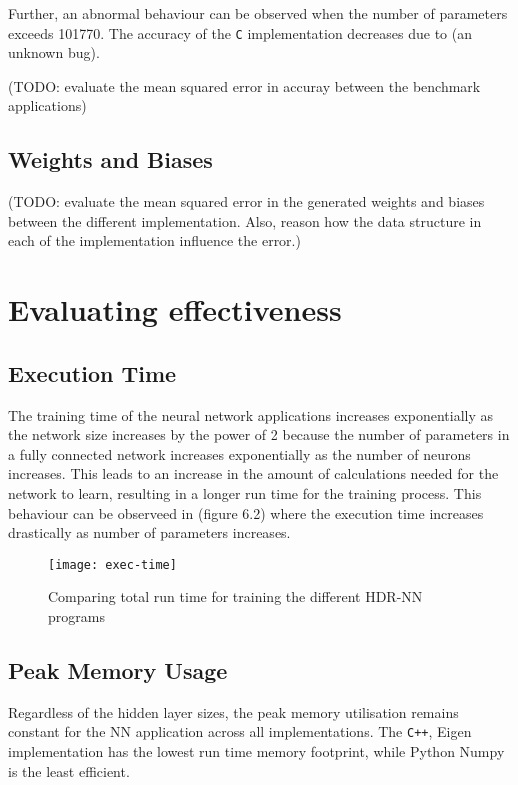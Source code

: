 Further, an abnormal behaviour can be observed when the number of parameters exceeds 101770. The accuracy of the \verb!C! implementation decreases due to (an unknown bug).

(TODO: evaluate the mean squared error in accuray between the benchmark applications)

\subsection{Weights and Biases}
(TODO: evaluate the mean squared error in the generated weights and biases between the different implementation. Also, reason how the data structure in each of the implementation influence the error.)


\section{Evaluating effectiveness}
\subsection{Execution Time}
The training time of the neural network applications increases exponentially as the network size increases by the power of 2 because the number of parameters in a fully connected network increases exponentially as the number of neurons increases. This leads to an increase in the amount of calculations needed for the network to learn, resulting in a longer run time for the training process. This behaviour can be observeed in (figure 6.2) where the execution time increases drastically as number of parameters increases.

\begin{figure}[!ht]
	\centering
	\texttt{[image: exec-time]}
	\caption[Execution Time vs Model Parameters]{Comparing total run time for training the different HDR-NN programs}
\end{figure}

\subsection{Peak Memory Usage}
Regardless of the hidden layer sizes, the peak memory utilisation remains constant for the NN application across all implementations. The \verb!C++!, Eigen implementation has the lowest run time memory footprint, while Python Numpy is the least efficient.

